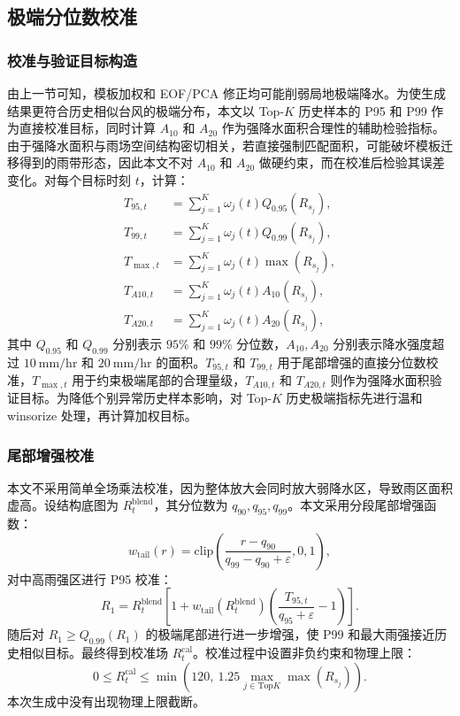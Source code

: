 \documentclass[UTF8,a4paper,zihao=5,fontset=fandol]{ctexart}
\numberwithin{equation}{section}
\numberwithin{figure}{section}
\numberwithin{table}{section}
\begin{document}
\subsection{极端分位数校准}

\subsubsection{校准与验证目标构造}

由上一节可知，模板加权和 EOF/PCA 修正均可能削弱局地极端降水。为使生成结果更符合历史相似台风的极端分布，本文以 Top-$K$ 历史样本的 P95 和 P99 作为直接校准目标，同时计算 $A_{10}$ 和 $A_{20}$ 作为强降水面积合理性的辅助检验指标。由于强降水面积与雨场空间结构密切相关，若直接强制匹配面积，可能破坏模板迁移得到的雨带形态，因此本文不对 $A_{10}$ 和 $A_{20}$ 做硬约束，而在校准后检验其误差变化。对每个目标时刻 $t$，计算：
\begin{align}
T_{95,t} &= \sum_{j=1}^{K}\omega_j(t)Q_{0.95}(R_{s_j}),\\
T_{99,t} &= \sum_{j=1}^{K}\omega_j(t)Q_{0.99}(R_{s_j}),\\
T_{\max,t} &= \sum_{j=1}^{K}\omega_j(t)\max(R_{s_j}),\\
T_{A10,t} &= \sum_{j=1}^{K}\omega_j(t)A_{10}(R_{s_j}),\\
T_{A20,t} &= \sum_{j=1}^{K}\omega_j(t)A_{20}(R_{s_j}),
\end{align}
其中 $Q_{0.95}$ 和 $Q_{0.99}$ 分别表示 $95\%$ 和 $99\%$ 分位数，$A_{10},A_{20}$ 分别表示降水强度超过 $10\ \mathrm{mm/hr}$ 和 $20\ \mathrm{mm/hr}$ 的面积。$T_{95,t}$ 和 $T_{99,t}$ 用于尾部增强的直接分位数校准，$T_{\max,t}$ 用于约束极端尾部的合理量级，$T_{A10,t}$ 和 $T_{A20,t}$ 则作为强降水面积验证目标。为降低个别异常历史样本影响，对 Top-$K$ 历史极端指标先进行温和 winsorize 处理，再计算加权目标。

\subsubsection{尾部增强校准}

本文不采用简单全场乘法校准，因为整体放大会同时放大弱降水区，导致雨区面积虚高。设结构底图为 $R_t^{\mathrm{blend}}$，其分位数为 $q_{90},q_{95},q_{99}$。本文采用分段尾部增强函数：
\begin{equation}
w_{\mathrm{tail}}(r)
=
\mathrm{clip}
\left(
\frac{r-q_{90}}{q_{99}-q_{90}+\varepsilon},0,1
\right),
\end{equation}
对中高雨强区进行 P95 校准：
\begin{equation}
R_1
=
R_t^{\mathrm{blend}}
\left[
1+w_{\mathrm{tail}}(R_t^{\mathrm{blend}})
\left(
\frac{T_{95,t}}{q_{95}+\varepsilon}-1
\right)
\right].
\end{equation}
随后对 $R_1\ge Q_{0.99}(R_1)$ 的极端尾部进行进一步增强，使 P99 和最大雨强接近历史相似目标。最终得到校准场 $R_t^{\mathrm{cal}}$。校准过程中设置非负约束和物理上限：
\begin{equation}
0\le R_t^{\mathrm{cal}}\le
\min\left(120,\ 1.25\max_{j\in\mathrm{Top}K}\max(R_{s_j})\right).
\end{equation}
本次生成中没有出现物理上限截断。
\end{document}
